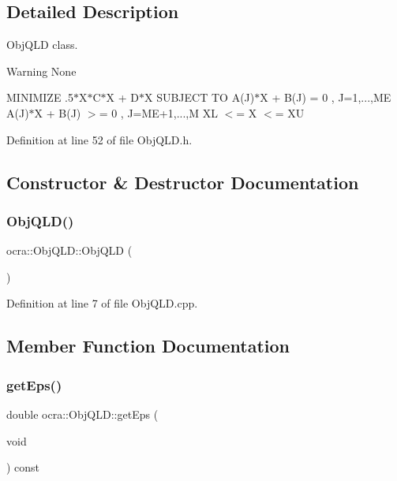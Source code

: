 \subsection{Detailed Description}
Obj\+Q\+LD class. 

\begin{DoxyWarning}{Warning}
None
\end{DoxyWarning}
M\+I\+N\+I\+M\+I\+ZE .5$\ast$X\textquotesingle{}$\ast$\+C$\ast$X + D\textquotesingle{}$\ast$X S\+U\+B\+J\+E\+CT TO A(\+J)$\ast$X + B(\+J) = 0 , J=1,...,ME A(\+J)$\ast$X + B(\+J) $>$= 0 , J=M\+E+1,...,M XL $<$= X $<$= XU 

Definition at line 52 of file Obj\+Q\+L\+D.\+h.



\subsection{Constructor \& Destructor Documentation}
\hypertarget{classocra_1_1ObjQLD_a947a8380d40c94bdcec2f228df03eac1}{}\label{classocra_1_1ObjQLD_a947a8380d40c94bdcec2f228df03eac1} 
\subsubsection{\texorpdfstring{Obj\+Q\+L\+D()}{ObjQLD()}}
{\footnotesize\ttfamily ocra\+::\+Obj\+Q\+L\+D\+::\+Obj\+Q\+LD (\begin{DoxyParamCaption}{ }\end{DoxyParamCaption})}



Definition at line 7 of file Obj\+Q\+L\+D.\+cpp.



\subsection{Member Function Documentation}
\hypertarget{classocra_1_1ObjQLD_afe990f46474b7a298c7180d6839c47dc}{}\label{classocra_1_1ObjQLD_afe990f46474b7a298c7180d6839c47dc} 
\subsubsection{\texorpdfstring{get\+Eps()}{getEps()}}
{\footnotesize\ttfamily double ocra\+::\+Obj\+Q\+L\+D\+::get\+Eps (\begin{DoxyParamCaption}\item[{void}]{ }\end{DoxyParamCaption}) const\hspace{0.3cm}{\ttfamily [inline]}}



